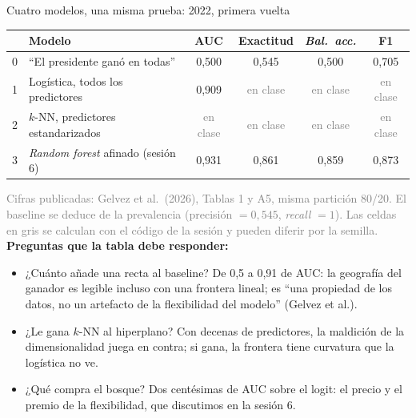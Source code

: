 \documentclass{beamer}
\newcommand{\1}{\mathbb{I}}
\begin{document}
\begin{frame}{Cuatro modelos, una misma prueba: 2022, primera vuelta}
\small
\begin{center}
\scriptsize
\setlength{\tabcolsep}{4pt}
\renewcommand{\arraystretch}{1.2}
\begin{tabular}{llcccc}
\hline
 & Modelo & AUC & Exactitud & \emph{Bal.\ acc.} & F1 \\
\hline
0 & ``El presidente ganó en todas'' & 0,500 & 0,545 & 0,500 & 0,705 \\
1 & Logística, todos los predictores & 0,909 & \textcolor{gray}{en clase} & \textcolor{gray}{en clase} & \textcolor{gray}{en clase} \\
2 & $k$-NN, predictores estandarizados & \textcolor{gray}{en clase} & \textcolor{gray}{en clase} & \textcolor{gray}{en clase} & \textcolor{gray}{en clase} \\
3 & \emph{Random forest} afinado (sesión 6) & 0,931 & 0,861 & 0,859 & 0,873 \\
\hline
\end{tabular}
\end{center}
{\scriptsize\textcolor{gray}{Cifras publicadas: Gelvez et al.\ (2026), Tablas 1 y A5, misma partición 80/20. El baseline se deduce de la prevalencia (precisión $= 0{,}545$, \emph{recall} $= 1$). Las celdas en gris se calculan con el código de la sesión y pueden diferir por la semilla.}}
\pause
\vspace{0.1cm}
\textbf{Preguntas que la tabla debe responder:}
\begin{itemize}\itemsep3pt
  \item ¿Cuánto añade una recta al baseline? De 0,5 a 0,91 de AUC: la geografía del ganador es legible incluso con una frontera lineal; es ``una propiedad de los datos, no un artefacto de la flexibilidad del modelo'' (Gelvez et al.). \pause
  \item ¿Le gana $k$-NN al hiperplano? Con decenas de predictores, la maldición de la dimensionalidad juega en contra; si gana, la frontera tiene curvatura que la logística no ve. \pause
  \item ¿Qué compra el bosque? Dos centésimas de AUC sobre el logit: el precio y el premio de la flexibilidad, que discutimos en la sesión 6.
\end{itemize}
\end{frame}
\end{document}
